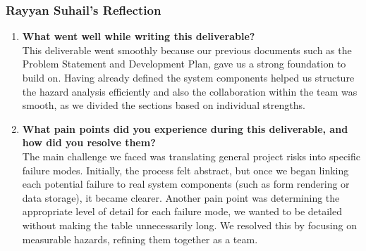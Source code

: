 \documentclass[12pt]{article}
\begin{document}
\subsubsection*{Rayyan Suhail's Reflection}
\begin{enumerate}
    \item \textbf{What went well while writing this deliverable?} \\

    This deliverable went smoothly because our previous documents such as the Problem Statement and Development Plan, gave us a strong foundation to build on. Having already defined the system components helped us structure the hazard analysis efficiently and also the collaboration within the team was smooth, as we divided the sections based on individual strengths. 

    \item \textbf{What pain points did you experience during this deliverable, and how did you resolve them?} \\

    The main challenge we faced was translating general project risks into specific failure modes. Initially, the process felt abstract, but once we began linking each potential failure to real system components (such as form rendering or data storage), it became clearer. Another pain point was determining the appropriate level of detail for each failure mode, we wanted to be detailed without making the table unnecessarily long. We resolved this by focusing on measurable hazards, refining them together as a team. 
\end{enumerate}
\end{document}
